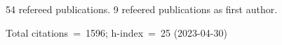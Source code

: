54 refereed publications. 9 refeered publications as first author.

Total citations~=~1596; h-index~=~25 (2023-04-30)